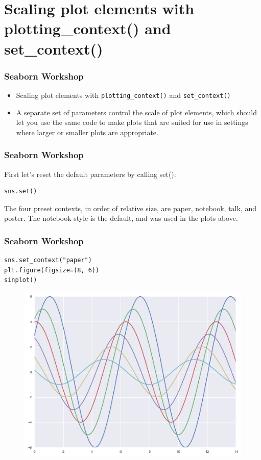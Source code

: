 \documentclass{beamer}
\begin{document}
\section{
	Scaling plot elements with plotting\_context() and set\_context()}
\begin{frame}[fragile]
	\frametitle{Seaborn Workshop}
	\large
	\begin{itemize}
\item Scaling plot elements with \texttt{plotting\_context()} and \texttt{set\_context()}
\item A separate set of parameters control the scale of plot elements, which should let you use the same code to make plots that are suited for use in settings where larger or smaller plots are appropriate.
	\end{itemize}

\end{frame}
\begin{frame}[fragile]
	\frametitle{Seaborn Workshop}
	\large
First let’s reset the default parameters by calling set():
\begin{verbatim}
sns.set()
\end{verbatim}

The four preset contexts, in order of relative size, are paper, notebook, talk, and poster. The notebook style is the default, and was used in the plots above.
\end{frame}
\begin{frame}[fragile]
	\frametitle{Seaborn Workshop}
	\large
\begin{verbatim}
sns.set_context("paper")
plt.figure(figsize=(8, 6))
sinplot()
\end{verbatim}

\begin{figure}
	\centering
	\includegraphics[width=0.7\linewidth]{images/aesthetics_35_0}
\end{figure}


\end{frame}
\end{document}
